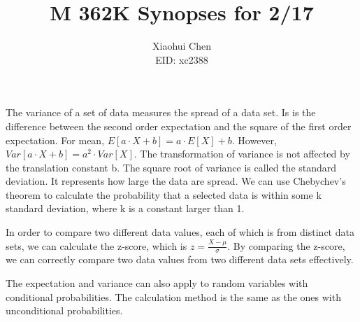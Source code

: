 \documentclass[12pt]{article}
\author{Xiaohui Chen \\EID: xc2388}
\title{M 362K Synopses for 2/17}
\begin{document}
\maketitle
\begin{spacing}{2.0}

The variance of a set of data measures the spread of a data set. Is is the difference between the second order expectation and the square of the first order expectation. For mean, $E[a\cdot X+b ]= a\cdot E[X]+b$. However, $Var[a\cdot X+b] = a^2 \cdot Var[X]$. The transformation of variance is not affected by the translation constant b. The square root of variance is called the standard deviation. It represents how large the data are spread. We can use Chebychev's theorem to calculate the probability that a selected data is within some k standard deviation, where k is a constant larger than 1.

In order to compare two different data values, each of which is from distinct data sets, we can calculate the z-score, which is $z=\frac{X-\mu}{\sigma}$. By comparing the z-score, we can correctly compare two data values from two different data sets effectively.

The expectation and variance can also apply to random variables with conditional probabilities. The calculation method is the same as the ones with unconditional probabilities. 

\end{spacing}
\end{document}
